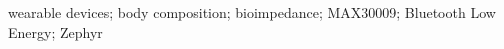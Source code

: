 \documentclass[diplomskirad, numeric, utf8, times]{fer}
\begin{document}
\begin{keywords}
wearable devices; body composition; bioimpedance; MAX30009; Bluetooth Low Energy; Zephyr 
\end{keywords}



\backmatter


\end{document}
